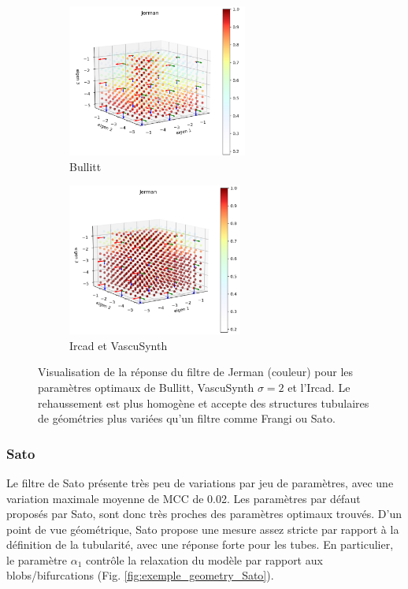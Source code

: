 \begin{figure}[H]

  \begin{subfigure}[t]{0.45\textwidth}
    \centering
    \includegraphics[height=5cm]{Images/Bullitt_Jerman_BP.png}
    \caption{Bullitt}
  \end{subfigure}
  
  \begin{subfigure}[t]{0.45\textwidth}
    \centering
    \includegraphics[height=5cm]{Images/Ircad_Jerman_BP.png}
    \caption{Ircad et VascuSynth}
  \end{subfigure}
  \caption{Visualisation de la réponse du filtre de Jerman (couleur) pour les paramètres optimaux de Bullitt, VascuSynth $\sigma=2$ et l'Ircad. Le rehaussement est plus homogène et accepte des structures tubulaires de géométries plus variées qu'un filtre comme Frangi ou Sato.}
  \label{fig:exemple_geometry_jerman}
\end{figure}

\subsubsection{Sato}
Le filtre de Sato présente très peu de variations par jeu de paramètres, avec une variation maximale moyenne de MCC de 0.02. Les paramètres par défaut proposés par Sato, sont donc très proches des paramètres optimaux trouvés. D'un point de vue géométrique, Sato propose une mesure assez stricte par rapport à la définition de la tubularité, avec une réponse forte pour les tubes. En particulier, le paramètre $\alpha_1$ contrôle la relaxation du modèle par rapport aux blobs/bifurcations (Fig. \ref{fig:exemple_geometry_Sato}).


